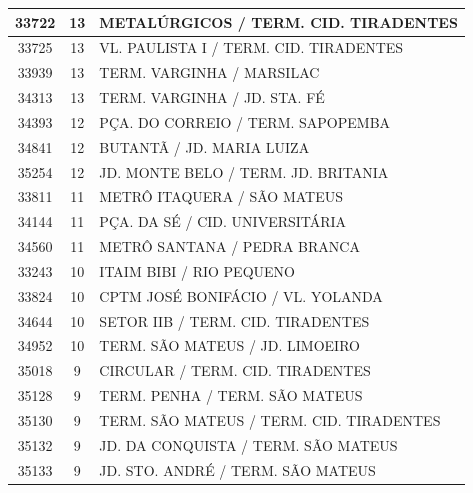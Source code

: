\documentclass[
	12pt,				%
	oneside,			%
	a4paper,			%
	english,			%
	brazil				%
	]{abntex2ppgsi}
\begin{document}
{{\begin{apendicesenv}
\begin{longtable}{c|c|p{7cm}}
    33722 & 13    & METALÚRGICOS / TERM. CID. TIRADENTES \\
\hline

    33725 & 13    & VL. PAULISTA I / TERM. CID. TIRADENTES \\
\hline

    33939 & 13    & TERM. VARGINHA / MARSILAC \\
\hline

    34313 & 13    & TERM. VARGINHA / JD. STA. FÉ \\
\hline

    34393 & 12    & PÇA. DO CORREIO / TERM. SAPOPEMBA \\
\hline

    34841 & 12    & BUTANTÃ / JD. MARIA LUIZA \\
\hline

    35254 & 12    & JD. MONTE BELO / TERM. JD. BRITANIA \\
\hline

    33811 & 11    & METRÔ ITAQUERA / SÃO MATEUS \\
\hline

    34144 & 11    & PÇA. DA SÉ / CID. UNIVERSITÁRIA \\
\hline

    34560 & 11    & METRÔ SANTANA / PEDRA BRANCA \\
\hline

    33243 & 10    & ITAIM BIBI / RIO PEQUENO \\
\hline

    33824 & 10    & CPTM JOSÉ BONIFÁCIO / VL. YOLANDA \\
\hline

    34644 & 10    & SETOR IIB / TERM. CID. TIRADENTES \\
\hline

    34952 & 10    & TERM. SÃO MATEUS / JD. LIMOEIRO \\
\hline

    35018 & 9     & CIRCULAR / TERM. CID. TIRADENTES \\
\hline

    35128 & 9     & TERM. PENHA / TERM. SÃO MATEUS \\
\hline

    35130 & 9     & TERM. SÃO MATEUS / TERM. CID. TIRADENTES \\
\hline

    35132 & 9     & JD. DA CONQUISTA / TERM. SÃO MATEUS \\
\hline

    35133 & 9     & JD. STO. ANDRÉ / TERM. SÃO MATEUS \\
\hline


\end{longtable}
\end{apendicesenv}}}
\end{document}
